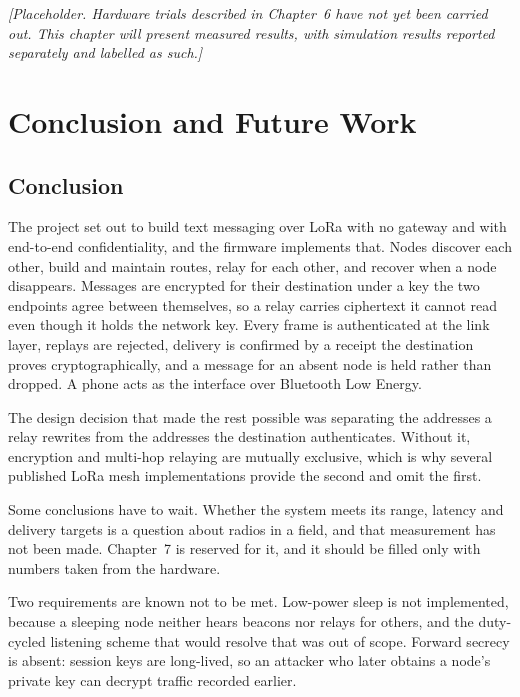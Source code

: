 \documentclass[12pt,a4paper,oneside]{report}
\begin{document}
\textit{[Placeholder. Hardware trials described in Chapter~6 have not yet been
carried out. This chapter will present measured results, with simulation results
reported separately and labelled as such.]}

\chapter{Conclusion and Future Work}

\section{Conclusion}

The project set out to build text messaging over LoRa with no gateway and with
end-to-end confidentiality, and the firmware implements that. Nodes discover each
other, build and maintain routes, relay for each other, and recover when a node
disappears. Messages are encrypted for their destination under a key the two
endpoints agree between themselves, so a relay carries ciphertext it cannot read
even though it holds the network key. Every frame is authenticated at the link
layer, replays are rejected, delivery is confirmed by a receipt the destination
proves cryptographically, and a message for an absent node is held rather than
dropped. A phone acts as the interface over Bluetooth Low Energy.

The design decision that made the rest possible was separating the addresses a
relay rewrites from the addresses the destination authenticates. Without it,
encryption and multi-hop relaying are mutually exclusive, which is why several
published LoRa mesh implementations provide the second and omit the first.

Some conclusions have to wait. Whether the system meets its range, latency and
delivery targets is a question about radios in a field, and that measurement has
not been made. Chapter~7 is reserved for it, and it should be filled only with
numbers taken from the hardware.

Two requirements are known not to be met. Low-power sleep is not implemented,
because a sleeping node neither hears beacons nor relays for others, and the
duty-cycled listening scheme that would resolve that was out of scope. Forward
secrecy is absent: session keys are long-lived, so an attacker who later obtains
a node's private key can decrypt traffic recorded earlier.
\end{document}
